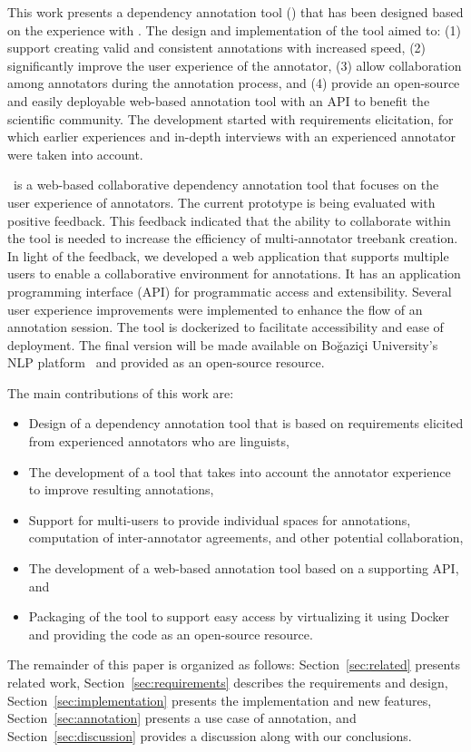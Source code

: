 This work presents a dependency annotation tool (\boatvtwo) that has been designed based on the experience with \boatvone.
The design and implementation of the tool aimed to: (1) support creating valid and consistent annotations with increased speed, (2) significantly improve the user experience of the annotator, (3) allow collaboration among annotators during the annotation process, and (4) provide an open-source and easily deployable web-based annotation tool with an API to benefit the scientific community.
The development started with requirements elicitation, for which earlier experiences and in-depth interviews with an experienced annotator were taken into account.

\boatvtwo\ is a web-based collaborative dependency annotation tool that focuses on the user experience of annotators.
The current prototype is being evaluated with positive feedback.
This feedback indicated that the ability to collaborate within the tool is needed to increase the efficiency of multi-annotator treebank creation.
In light of the feedback, we developed a web application that supports multiple users to enable a collaborative environment for annotations.
It has an application programming interface (API) for programmatic access and extensibility.
Several user experience improvements were implemented to enhance the flow of an annotation session.
The tool is dockerized to facilitate accessibility and ease of deployment.
The final version will be made available on Boğaziçi University's NLP platform~\cite{DIP} and provided as an open-source resource.

The main contributions of this work are:
\begin{itemize}
\setlength\itemsep{0em}
        \item Design of a dependency annotation tool that is based on requirements elicited from experienced annotators who are linguists,
        \item The development of a tool that takes into account the annotator experience to improve resulting annotations,
        \item Support for multi-users to provide individual spaces for annotations, computation of inter-annotator agreements, and other potential collaboration,
        \item The development of a web-based annotation tool based on a supporting API, and
        \item Packaging of the tool to support easy access by virtualizing it using Docker~\cite{docker} and providing the code as an open-source resource.
\end{itemize}

The remainder of this paper is organized as follows:
Section~\ref{sec:related} presents related work,
Section~\ref{sec:requirements} describes the requirements and design,
Section~\ref{sec:implementation} presents the implementation and new features,
Section~\ref{sec:annotation} presents a use case of annotation, and
Section~\ref{sec:discussion} provides a discussion along with our conclusions.
